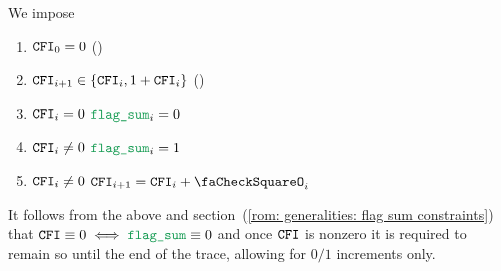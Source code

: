 We impose
\begin{enumerate}
	\item $\texttt{CFI} _{0} = 0$ (\sanityCheck)
	\item $\texttt{CFI} _{i + 1} \in \{ \texttt{CFI} _{i}, 1 + \texttt{CFI} _{i} \}$ (\sanityCheck)
	\item \If $\texttt{CFI} _{i} =    0$ \Then $\flagSum _{i} = 0$
	\item \If $\texttt{CFI} _{i} \neq 0$ \Then $\flagSum _{i} = 1$
	\item \If $\texttt{CFI} _{i} \neq 0$ \Then $\romColumnCfi _{i + 1} = \romColumnCfi _{i} + \done _{i}$
\end{enumerate}
\saNote{}
It follows from the above and
section~(\ref{rom: generalities: flag sum constraints})
that $\romColumnCfi \equiv 0 \iff \flagSum \equiv 0$
and once $\texttt{CFI}$ is nonzero it is required to remain so until the end of the trace,
allowing for $0/1$ increments only.
